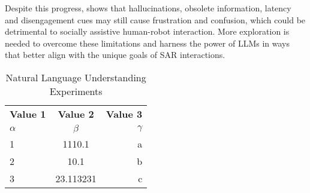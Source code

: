 \documentclass[
twocolumn,
]{ceurart}
\begin{document}
Despite this progress, \citet{irfan2023between} shows that hallucinations, obsolete information, latency and disengagement cues may still cause frustration and confusion, which could be detrimental to socially assistive human-robot interaction. 
More exploration is needed to overcome these limitations and harness the power of LLMs in ways that better align with the unique goals of SAR interactions.

\begin{table}[h!]
  \begin{center}
    \caption{Natural Language Understanding Experiments}
    \label{tab:table1}
    \begin{tabular}{l|c|r} %
      \textbf{Value 1} & \textbf{Value 2} & \textbf{Value 3}\\
      $\alpha$ & $\beta$ & $\gamma$ \\
      \hline
      1 & 1110.1 & a\\
      2 & 10.1 & b\\
      3 & 23.113231 & c\\
    \end{tabular}
  \end{center}
\end{table}




\end{document}
